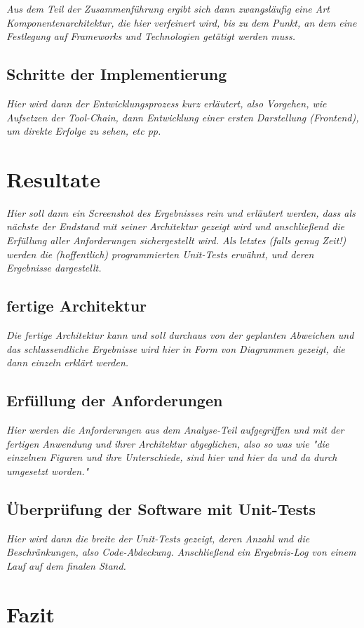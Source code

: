 \emph{Aus dem Teil der Zusammenführung ergibt sich dann zwangsläufig eine Art Komponentenarchitektur, die hier verfeinert wird, bis zu dem Punkt, an dem eine Festlegung auf Frameworks und Technologien getätigt werden muss.}

\subsection{Schritte der Implementierung}
\label{subsec:Implementierung}

\emph{Hier wird dann der Entwicklungsprozess kurz erläutert, also Vorgehen, wie Aufsetzen der Tool-Chain, dann Entwicklung einer ersten Darstellung (Frontend), um direkte Erfolge zu sehen, etc pp.}

\section{Resultate}
\label{sec:Resultate}

\emph{Hier soll dann ein Screenshot des Ergebnisses rein und erläutert werden, dass als nächste der Endstand mit seiner Architektur gezeigt wird und anschließend die Erfüllung aller Anforderungen sichergestellt wird. Als letztes (falls genug Zeit!) werden die (hoffentlich) programmierten Unit-Tests erwähnt, und deren Ergebnisse dargestellt.}

\subsection{fertige Architektur}
\label{subsec:f_architektur}

\emph{Die fertige Architektur kann und soll durchaus von der geplanten Abweichen und das schlussendliche Ergebnisse wird hier in Form von Diagrammen gezeigt, die dann einzeln erklärt werden.}

\subsection{Erfüllung der Anforderungen}
\label{subsec:erfullung_anforderungen}

\emph{Hier werden die Anforderungen aus dem Analyse-Teil aufgegriffen und mit der fertigen Anwendung und ihrer Architektur abgeglichen, also so was wie "die einzelnen Figuren und ihre Unterschiede, sind hier und hier da und da durch umgesetzt worden."}

\subsection{Überprüfung der Software mit Unit-Tests}
\label{subsec:unittests}

\emph{Hier wird dann die breite der Unit-Tests gezeigt, deren Anzahl und die Beschränkungen, also Code-Abdeckung. Anschließend ein Ergebnis-Log von einem Lauf auf dem finalen Stand.}


\section{Fazit}
\label{sec:Fazit}